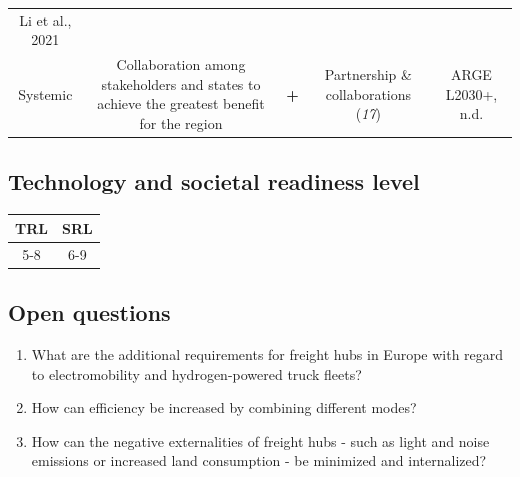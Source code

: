 \documentclass[
]{book}
\providecommand{\tightlist}{%
  \setlength{\itemsep}{0pt}\setlength{\parskip}{0pt}}
\begin{document}
\begin{longtable}[]{@{}ccccc@{}}
\begin{minipage}[t]{0.17\columnwidth}
Li et al., 2021\strut
\end{minipage}\tabularnewline
\begin{minipage}[t]{0.17\columnwidth}\centering
Systemic\strut
\end{minipage} & \begin{minipage}[t]{0.16\columnwidth}\centering
Collaboration among stakeholders and states to achieve the greatest benefit for the region\strut
\end{minipage} & \begin{minipage}[t]{0.17\columnwidth}\centering
\textbf{+}\strut
\end{minipage} & \begin{minipage}[t]{0.17\columnwidth}\centering
Partnership \& collaborations (\emph{17})\strut
\end{minipage} & \begin{minipage}[t]{0.17\columnwidth}\centering
ARGE L2030+, n.d.\strut
\end{minipage}\tabularnewline
\bottomrule
\end{longtable}

\hypertarget{technology-and-societal-readiness-level-35}{%
\subsection*{Technology and societal readiness level}\label{technology-and-societal-readiness-level-35}}

\begin{longtable}[]{@{}cc@{}}
\toprule
TRL & SRL\tabularnewline
\midrule
\endhead
5-8 & 6-9\tabularnewline
\bottomrule
\end{longtable}

\hypertarget{open-questions-35}{%
\subsection*{Open questions}\label{open-questions-35}}

\begin{enumerate}
\def\labelenumi{\arabic{enumi}.}
\tightlist
\item
  What are the additional requirements for freight hubs in Europe with regard to electromobility and hydrogen-powered truck fleets?
\item
  How can efficiency be increased by combining different modes?
\item
  How can the negative externalities of freight hubs - such as light and noise emissions or increased land consumption - be minimized and internalized?
\end{enumerate}
\end{document}
